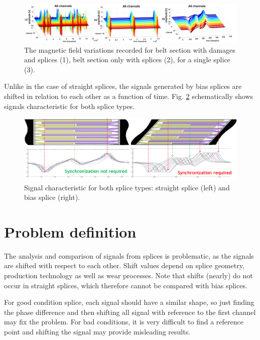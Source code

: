 \documentclass[applsci,article,preprint,moreauthors,pdftex]{Definitions/mdpi}
\begin{document}
\begin{figure}[ht!]
\centering
\includegraphics[width=\textwidth]{figs/belt1.png}
\caption{The magnetic field variations recorded for belt section with damages and splices (1), belt section only with splices (2), for a single splice (3).}
\label{fig:belt1}
\end{figure}

Unlike in the case of straight splices, the signals generated by bias splices are shifted in relation to each other as a function of time. Fig. \ref{fig:belt2} schematically shows signals characteristic for both splice types.

\begin{figure}[ht!]
\centering
\includegraphics[width=\textwidth]{figs/belt2.png}
\caption{Signal characteristic for both splice types: straight splice (left) and bias splice (right).}
\label{fig:belt2}
\end{figure}

\section{Problem definition}

The analysis and comparison of signals from splices is problematic, as the signals are shifted with respect to each other. Shift values depend on splice geometry, production technology as well as wear processes. Note that shifts (nearly) do not occur in straight splices, which therefore cannot be compared with bias splices.

For good condition splice, each signal should have a similar shape, so just finding the phase difference and then shifting all signal with reference to the first channel may fix the problem. For bad conditions, it is very difficult to find a reference point and shifting the signal may provide misleading results. 
\end{document}

